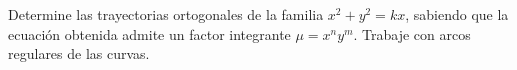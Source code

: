 Determine las trayectorias ortogonales de la familia $x^2+y^2=kx$, sabiendo que la ecuación obtenida admite un factor integrante $\mu=x^ny^m$. Trabaje con arcos regulares de las curvas.
